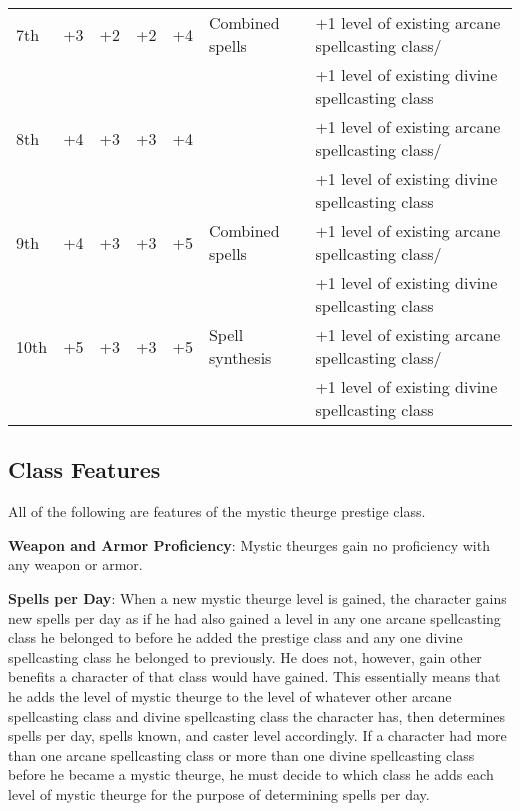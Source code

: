 \begin{table*}[]
\begin{tabular}{lllllll}
7th & +3 & +2 & +2 & +4 & Combined spells & +1 level of existing arcane spellcasting class/\\
    &    &    &    &    &                 & +1 level of existing divine spellcasting class\\
8th & +4 & +3 & +3 & +4 &  & +1 level of existing arcane spellcasting class/\\
    &    &    &    &    &                 & +1 level of existing divine spellcasting class\\
9th & +4 & +3 & +3 & +5 & Combined spells & +1 level of existing arcane spellcasting class/\\
    &    &    &    &    &                 & +1 level of existing divine spellcasting class\\
10th & +5 & +3 & +3 & +5 & Spell synthesis & +1 level of existing arcane spellcasting class/\\
    &    &    &    &    &                 & +1 level of existing divine spellcasting class\\
\end{tabular}
\end{table*}
				
\subsection{Class Features}

				
All of the following are features of the mystic theurge prestige class.
				
\textbf{Weapon and Armor Proficiency}: Mystic theurges gain no proficiency with any weapon or armor.
				
\textbf{Spells per Day}: When a new mystic theurge level is gained, the character gains new spells per day as if he had also gained a level in any one arcane spellcasting class he belonged to before he added the prestige class and any one divine spellcasting class he belonged to previously. He does not, however, gain other benefits a character of that class would have gained. This essentially means that he adds the level of mystic theurge to the level of whatever other arcane spellcasting class and divine spellcasting class the character has, then determines spells per day, spells known, and caster level accordingly. If a character had more than one arcane spellcasting class or more than one divine spellcasting class before he became a mystic theurge, he must decide to which class he adds each level of mystic theurge for the purpose of determining spells per day.
				
